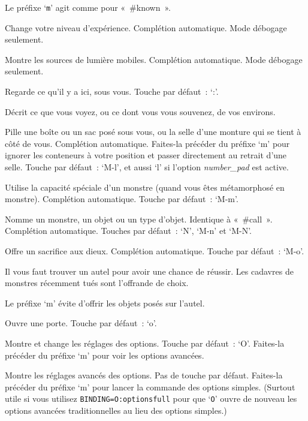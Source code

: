 \documentclass[titlepage]{article}
\begin{document}
\begin{description}
Le préfixe `\texttt{m}' agit comme pour «~\#known~».

\item[{\#levelchange}]
Change votre niveau d'expérience.
Complétion automatique.
Mode débogage seulement.

\item[{\#lightsources}]
Montre les sources de lumière mobiles.
Complétion automatique.
Mode débogage seulement.

\item[{\#look}]
Regarde ce qu'il y a ici, sous vous.
Touche par défaut~: `:'.

\item[{\#lookaround}]
Décrit ce que vous voyez, ou ce dont vous vous souvenez, de vos
environs.

\item[{\#loot}]
Pille une boîte ou un sac posé sous vous, ou la selle d'une monture qui
se tient à côté de vous.
Complétion automatique.
Faites-la précéder du préfixe `m' pour ignorer les conteneurs à votre
position et passer directement au retrait d'une selle.
Touche par défaut~: `M-l', et aussi `l' si l'option
\textit{number\_pad}
est active.

\item[{\#monster}]
Utilise la capacité spéciale d'un monstre (quand vous êtes métamorphosé
en monstre).
Complétion automatique.
Touche par défaut~: `M-m'.

\item[{\#name}]
Nomme un monstre, un objet ou un type d'objet.
Identique à «~\#call~».
Complétion automatique.
Touches par défaut~: `N', `M-n' et `M-N'.

\item[{\#offer}]
Offre un sacrifice aux dieux.
Complétion automatique.
Touche par défaut~: `M-o'.


Il vous faut trouver un autel pour avoir une chance de réussir.
Les cadavres de monstres récemment tués sont l'offrande de choix.


Le préfixe `m' évite d'offrir les objets posés sur l'autel.

\item[{\#open}]
Ouvre une porte.
Touche par défaut~: `o'.

\item[{\#options}]
Montre et change les réglages des options.
Touche par défaut~: `O'.
Faites-la précéder du préfixe `m' pour voir les options avancées.

\item[{\#optionsfull}]
Montre les réglages avancés des options.
Pas de touche par défaut.
Faites-la précéder du préfixe `m' pour lancer la commande des
options simples.
(Surtout utile si vous utilisez \texttt{BINDING=O:optionsfull} pour que
`\texttt{O}' ouvre de nouveau les options avancées traditionnelles au
lieu des options simples.)


\end{description}
\end{document}
